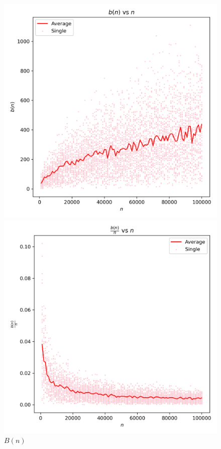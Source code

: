\documentclass{article}
\begin{document}
\begin{figure}[H]
    \centering
    \begin{minipage}{0.24\textwidth}
        \centering
        \includegraphics[width=\linewidth]{graphs/b_factor_vs_n.png}
        \caption{$B(n)$}
    \end{minipage}
    \begin{minipage}{0.24\textwidth}
        \centering
        \includegraphics[width=\linewidth]{graphs/b_factor_over_n_vs_n.png}

\end{minipage}
\end{figure}
\end{document}
